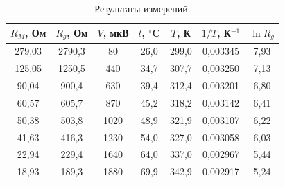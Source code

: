 \documentclass[a4paper,12pt]{article} %
\begin{document}
		\begin{table}[H]
			\caption{Результаты измерений.}
			\label{table:exp1}
			\begin{tabular}{|c|c|c|c|c|c|c|}
				\hline
				$R_M$, Ом & $R_g$, Ом & $V$, мкВ & $t$, $^\circ$C & $T$, К & $1/T$, К$^{-1}$ & $\ln R_g$ \\ \hline
				279,03    & 2790,3    & 80       & 26,0           & 299,0  & 0,003345        & 7,93      \\ \hline
				125,05    & 1250,5    & 440      & 34,7           & 307,7  & 0,003250        & 7,13      \\ \hline
				90,04     & 900,4     & 630      & 39,4           & 312,4  & 0,003201        & 6,80      \\ \hline
				60,57     & 605,7     & 870      & 45,2           & 318,2  & 0,003142        & 6,41      \\ \hline
				50,38     & 503,8     & 1020     & 48,9           & 321,9  & 0,003107        & 6,22      \\ \hline
				41,63     & 416,3     & 1230     & 54,0           & 327,0  & 0,003058        & 6,03      \\ \hline
				22,94     & 229,4     & 1640     & 64,0           & 337,0  & 0,002967        & 5,44      \\ \hline
				18,93     & 189,3     & 1880     & 69,9           & 342,9  & 0,002917        & 5,24      \\ \hline
			\end{tabular}
		\end{table}
	
	\newpage
\end{document}
